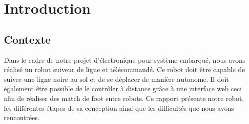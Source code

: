 \chapter{Introduction}

\section{Contexte}
Dans le cadre de notre projet d'électronique pour système embarqué, nous avons réalisé un robot suiveur de ligne et télécommandé.
Ce robot doit être capable de suivre une ligne noire au sol et de se déplacer de manière autonome.
Il doit également être possible de le contrôler à distance grâce à une interface web ceci afin de réaliser des match de foot entre robots.
Ce rapport présente notre robot, les différentes étapes de sa conception ainsi que les difficultés que nous avons rencontrées.
